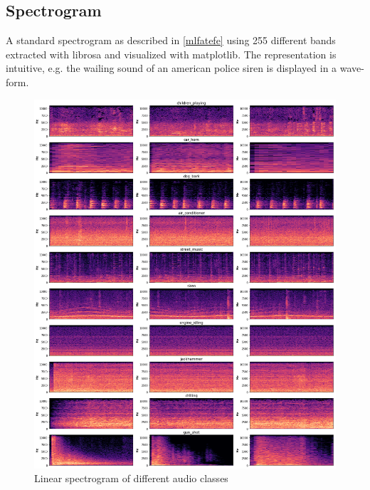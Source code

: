 
\newpage

\subsection{Spectrogram}

A standard spectrogram as described in \ref{mlfatefe} using 255 different bands extracted with librosa and visualized with matplotlib. The representation is intuitive, e.g. the wailing sound of an american police siren is displayed in a wave-form.

\begin{figure}[H]
    \centering
	\includegraphics[width=.9\textwidth]{./images/features/spec-lin}
    \caption{Linear spectrogram of different audio classes}
    \label{fig:spec}
\end{figure}


